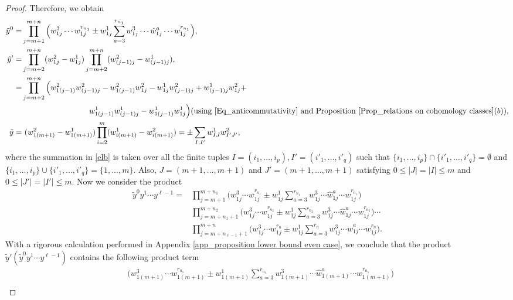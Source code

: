 \documentclass[12pt,oneside,reqno]{amsart}
\theoremstyle{plain}
\theoremstyle{definition}
\theoremstyle{remark}
\begin{document}
\begin{proof}
Therefore, we obtain
\begin{align}\label{elb}
\tilde{y}^0 = & \prod^{m+n}_{j=m+1}\Big(w^3_{1j} \cdots w^{r_{n_1}}_{1j} \pm w^1_{1j} \sum^{r_{n_1}}_{a=3} w^3_{1j} \cdots \hat{w}^a_{1j} \cdots w^{r_{n_1}}_{1j}\Big),\nonumber \\
 \tilde{y}' = & \prod^{m+n}_{j=m+2} (w^2_{1j} - w^1_{1j}) \prod^{m+n}_{j=m+2} (w^2_{(j-1)j} - w^1_{(j-1)j}), \nonumber \\
= & \prod^{m+n}_{j=m+2} \Big(w^2_{1(j-1)} w^2_{(j-1)j} - w^2_{1(j-1)} w^2_{1j} - w^1_{1j} w^2_{(j-1)j} + w^1_{(j-1)j} w^2_{1j} + \nonumber \\
& \hspace{3cm} w^1_{1(j-1)} w^1_{(j-1)j} - w^1_{1(j-1)} w^1_{1j}\Big) (\text{using \eqref{Eq_anticommutativity} and Proposition } \ref{Prop_relations on cohomology classes}(b)),\nonumber \\
\tilde{y} =&  ~(w^2_{1(m+1)} - w^1_{1(m+1)}) \prod^m_{i=2}(w^1_{i(m+1)} - w^2_{i(m+1)}) =  \pm \sum_{I,I'} w^1_{IJ} w^2_{I'J'},
\end{align}
where the summation in \eqref{elb} is taken over all the finite tuples $I = (i_1, \ldots , i_p), I' =(i'_1,\ldots, i'_q)$ such that $\{i_1, \ldots, i_p\} \cap \{i'_1, \ldots, i'_q\} = \emptyset$ and  $\{i_1, \ldots, i_p\} \cup \{i'_1, \ldots, i'_q\} = \{1, ..., m\}$. Also, $J=(m+1, \ldots, m+1)$ and $J'=(m+1, \ldots, m+1)$ satisfying $0\leq |J|=|I|\leq m$ and $0\leq |J'|=|I'| \leq m $.
Now we consider the product
\begin{align*}
\tilde{y}^0 y^1 \cdots y^{\ell-1} = & \prod^{m+n_1}_{j=m+1}\Big(w^3_{1j} \cdots w^{r_{n_1}}_{1j} \pm w^1_{1j} \sum^{r_{n_1}}_{a=3} w^3_{1j} \cdots \hat{w}^a_{1j} \cdots w^{r_{n_1}}_{1j}\Big)\\
& \prod^{m+n_2}_{j=m+n_1 +1} \Big(w^3_{1j} \cdots w^{r_{n_2}}_{1j} \pm w^1_{1j} \sum^{r_{n_2}}_{a=3} w^3_{1j} \cdots \hat{w}^a_{1j} \cdots w^{r_{n_2}}_{1j}\Big) \cdots \\
& \prod^{m+n}_{j=m+n_{\ell-1} +1}\Big(w^3_{1j} \cdots w^{r_{n}}_{1j} \pm w^1_{1j} \sum^{r_{n}}_{a=3} w^3_{1j} \cdots \hat{w}^a_{1j} \cdots w^{r_{n}}_{1j}\Big).
\end{align*}
With a rigorous calculation performed in Appendix \ref{app_proposition lower bound even case}, we conclude that the product $\tilde{y}' (\tilde{y}^0 y^1 \cdots y^{\ell-1})$ contains the following product term 
\begin{equation}\label{eut}
\begin{split}
&\Big(w^3_{1(m+1)} \cdots w^{r_{n_1}}_{1(m+1)} \pm w^1_{1(m+1)} \sum^{r_{n_1}}_{a=3} w^3_{1(m+1)} \cdots \hat{w}^a_{1(m+1)} \cdots w^{r_{n_1}}_{1(m+1)}\Big)\\

\end{split}
\end{equation}
\end{proof}
\end{document}
